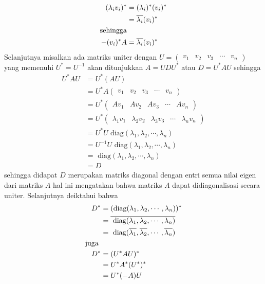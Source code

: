 \documentclass[11pt,a4paper]{article}
\theoremstyle{plain}
\theoremstyle{definition}
\theoremstyle{remark}
\begin{document}
\begin{enumerate}
\begin{enumerate}
\begin{align*}
	(\lambda_{i} v_{i})^* &= (\lambda_{i})^* (v_{i})^* \\
	&= \overline{\lambda_{i}}(v_{i})^* \\
	\text{sehingga} & \- \\
	-(v_{i})^*A &= \overline{\lambda_{i}}(v_{i})^*
	\end{align*}
	Selanjutnya misalkan ada matriks uniter dengan $U=\begin{pmatrix}
	v_{1} & v_{2} & v_{3} & \cdots & v_{n}
	\end{pmatrix}$ yang memenuhi $U^*=U^{-1}$ akan ditunjukkan $A=UDU^*$ atau $D=U^*AU$ sehingga
	\begin{align*}
	U^*AU &= U^*(AU) \\
	&= U^* A\begin{pmatrix}
	v_{1} & v_{2} & v_{3} & \cdots & v_{n}
	\end{pmatrix} \\
	&= U^* \begin{pmatrix}
	Av_{1} & Av_{2} & Av_{3} & \cdots & Av_{n}
	\end{pmatrix} \\
	&= U^* \begin{pmatrix}
	\lambda_{1}v_{1} & \lambda_{2}v_{2} & \lambda_{3}v_{3} & \cdots & \lambda_{n}v_{n}
	\end{pmatrix} \\
	&= U^*U \text{ diag}(\lambda_{1},\lambda_{2},\cdots,\lambda_{n}) \\
	&= U^{-1}U \text{ diag}(\lambda_{1},\lambda_{2},\cdots,\lambda_{n}) \\
	&= \text{ diag}(\lambda_{1},\lambda_{2},\cdots,\lambda_{n}) \\
	&= D
	\end{align*}
	sehingga didapat $D$ merupakan matriks diagonal dengan entri semua nilai eigen dari matriks $A$ hal ini mengatakan bahwa matriks $A$ dapat didiagonalisasi secara uniter. Selanjutnya deiktahui bahwa
	\begin{align*}
	D^* &= (\text{diag}(\lambda_{1},\lambda_{2},\cdots,\lambda_{n}))^* \\
	&= \overline{\text{ diag}(\lambda_{1},\lambda_{2},\cdots,\lambda_{n})} \\
	&= \text{ diag}(\overline{\lambda_{1}},\overline{\lambda_{2}},\cdots,\overline{\lambda_{n}}) \\
	\text{juga } & \- \\
	D^* &= (U^*AU)^* \\
	&= U^* A^* (U^*)^* \\
	&= U^* (-A) U \\

\end{align*}
\end{enumerate}
\end{enumerate}
\end{document}
